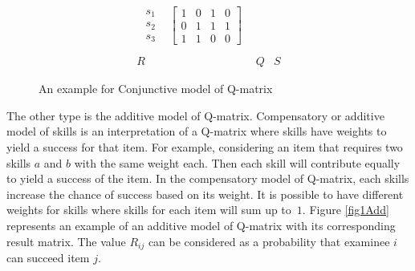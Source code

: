 \begin{figure}[h]
\begin{footnotesize}
\[\begin{array}{ccc}
\begin{array}{cc}
\begin{array}{c}
s_{1}\\
s_{2}\\
s_{3}
\end{array} & \left[\begin{array}{cccc}
1 & 0 & 1 & 0\\
0 & 1 & 1 & 1\\
1 & 1 & 0 & 0
\end{array}\right]
\end{array}\\
\\
R & Q & S
\end{array}
\]
 \end{footnotesize} \caption{An example for Conjunctive model of Q-matrix}


\label{fig1} 
\end{figure}

The other type is the additive model of Q-matrix. Compensatory or additive model of skills is an interpretation of a Q-matrix where skills have weights to yield a success for that item. For example, considering an item that requires two skills $a$ and $b$ with the same weight each. Then each skill will contribute equally to yield a success of the item. In the compensatory model of Q-matrix, each skills increase the chance of success based on its weight. It is possible to have different weights for skills where skills for each item will sum up to~$1$. Figure \ref{fig1Add} represents an example of an additive model of Q-matrix with its corresponding result matrix. The value $R_{ij}$  can be considered as a probability that examinee $i$ can succeed item $j$.

